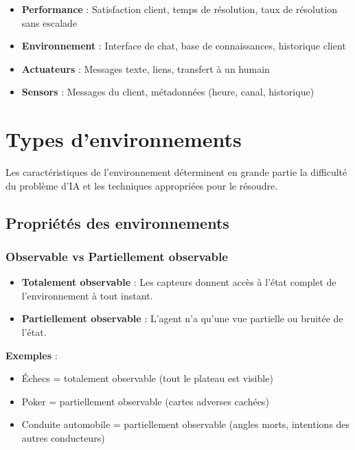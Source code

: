 \documentclass[11pt,a4paper]{article}
\begin{document}
\begin{exemplebox}
\begin{itemize}
    \item \textbf{Performance} : Satisfaction client, temps de résolution, taux de résolution sans escalade
    \item \textbf{Environnement} : Interface de chat, base de connaissances, historique client
    \item \textbf{Actuateurs} : Messages texte, liens, transfert à un humain
    \item \textbf{Sensors} : Messages du client, métadonnées (heure, canal, historique)
\end{itemize}
\end{exemplebox}

\section{Types d'environnements}

Les caractéristiques de l'environnement déterminent en grande partie la difficulté du problème d'IA et les techniques appropriées pour le résoudre.

\subsection{Propriétés des environnements}

\subsubsection{Observable vs Partiellement observable}

\begin{definitionbox}
\begin{itemize}
    \item \textbf{Totalement observable} : Les capteurs donnent accès à l'état complet de l'environnement à tout instant.
    \item \textbf{Partiellement observable} : L'agent n'a qu'une vue partielle ou bruitée de l'état.
\end{itemize}
\end{definitionbox}

\textbf{Exemples} : 
\begin{itemize}
    \item Échecs = totalement observable (tout le plateau est visible)
    \item Poker = partiellement observable (cartes adverses cachées)
    \item Conduite automobile = partiellement observable (angles morts, intentions des autres conducteurs)
\end{itemize}
\end{document}
